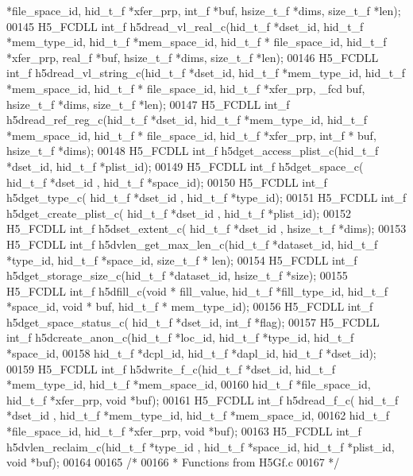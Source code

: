 \begin{DoxyCode}
      *file\_space\_id, hid\_t\_f *xfer\_prp, int\_f *buf, hsize\_t\_f *dims, size\_t\_f *len);
00145 H5\_FCDLL int\_f h5dread\_vl\_real\_c(hid\_t\_f *dset\_id, hid\_t\_f *mem\_type\_id, hid\_t\_f *mem\_space\_id, hid\_t\_f *
      file\_space\_id, hid\_t\_f *xfer\_prp, real\_f *buf, hsize\_t\_f *dims, size\_t\_f *len);
00146 H5\_FCDLL int\_f h5dread\_vl\_string\_c(hid\_t\_f *dset\_id, hid\_t\_f *mem\_type\_id, hid\_t\_f *mem\_space\_id, hid\_t\_f *
      file\_space\_id, hid\_t\_f *xfer\_prp, \_fcd buf, hsize\_t\_f *dims, size\_t\_f *len);
00147 H5\_FCDLL int\_f h5dread\_ref\_reg\_c(hid\_t\_f *dset\_id, hid\_t\_f *mem\_type\_id, hid\_t\_f *mem\_space\_id, hid\_t\_f *
      file\_space\_id, hid\_t\_f *xfer\_prp, int\_f * buf, hsize\_t\_f *dims);
00148 H5\_FCDLL int\_f h5dget\_access\_plist\_c(hid\_t\_f *dset\_id, hid\_t\_f *plist\_id);
00149 H5\_FCDLL int\_f h5dget\_space\_c( hid\_t\_f *dset\_id , hid\_t\_f *space\_id);
00150 H5\_FCDLL int\_f h5dget\_type\_c( hid\_t\_f *dset\_id , hid\_t\_f *type\_id);
00151 H5\_FCDLL int\_f h5dget\_create\_plist\_c( hid\_t\_f *dset\_id , hid\_t\_f *plist\_id);
00152 H5\_FCDLL int\_f h5dset\_extent\_c( hid\_t\_f *dset\_id , hsize\_t\_f *dims);
00153 H5\_FCDLL int\_f h5dvlen\_get\_max\_len\_c(hid\_t\_f *dataset\_id, hid\_t\_f *type\_id, hid\_t\_f *space\_id, size\_t\_f *
      len);
00154 H5\_FCDLL int\_f h5dget\_storage\_size\_c(hid\_t\_f *dataset\_id, hsize\_t\_f *size);
00155 H5\_FCDLL int\_f h5dfill\_c(\textcolor{keywordtype}{void} * fill\_value, hid\_t\_f *fill\_type\_id, hid\_t\_f *space\_id, \textcolor{keywordtype}{void} * buf, hid\_t\_f *
      mem\_type\_id);
00156 H5\_FCDLL int\_f h5dget\_space\_status\_c( hid\_t\_f *dset\_id, int\_f *flag);
00157 H5\_FCDLL int\_f h5dcreate\_anon\_c(hid\_t\_f *loc\_id, hid\_t\_f *type\_id, hid\_t\_f *space\_id,
00158                   hid\_t\_f *dcpl\_id, hid\_t\_f *dapl\_id, hid\_t\_f *dset\_id);
00159 H5\_FCDLL int\_f h5dwrite\_f\_c(hid\_t\_f *dset\_id, hid\_t\_f *mem\_type\_id, hid\_t\_f *mem\_space\_id, 
00160                    hid\_t\_f *file\_space\_id, hid\_t\_f *xfer\_prp, \textcolor{keywordtype}{void} *buf);
00161 H5\_FCDLL int\_f h5dread\_f\_c( hid\_t\_f *dset\_id ,  hid\_t\_f *mem\_type\_id, hid\_t\_f *mem\_space\_id, 
00162                    hid\_t\_f *file\_space\_id, hid\_t\_f *xfer\_prp, \textcolor{keywordtype}{void} *buf);
00163 H5\_FCDLL int\_f h5dvlen\_reclaim\_c(hid\_t\_f *type\_id ,  hid\_t\_f *space\_id, hid\_t\_f *plist\_id, \textcolor{keywordtype}{void} *buf);
00164 
00165 \textcolor{comment}{/*}
00166 \textcolor{comment}{ * Functions from H5Gf.c}
00167 \textcolor{comment}{ */}

\end{DoxyCode}
